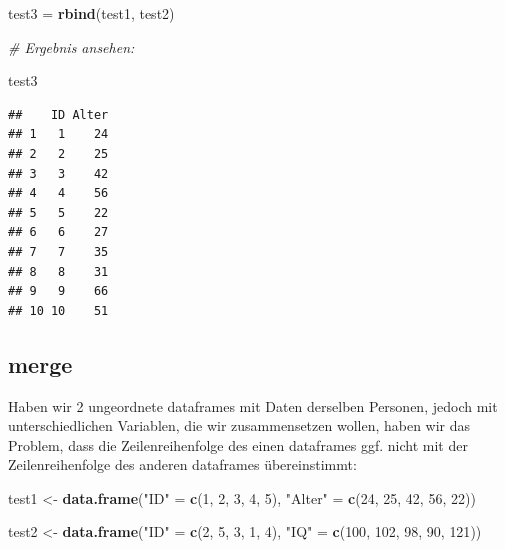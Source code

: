 \documentclass[
]{book}
\newenvironment{Shaded}{\begin{snugshade}}{\end{snugshade}}
\newcommand{\CommentTok}[1]{\textcolor[rgb]{0.56,0.35,0.01}{\textit{#1}}}
\newcommand{\DecValTok}[1]{\textcolor[rgb]{0.00,0.00,0.81}{#1}}
\newcommand{\FunctionTok}[1]{\textcolor[rgb]{0.13,0.29,0.53}{\textbf{#1}}}
\newcommand{\NormalTok}[1]{#1}
\newcommand{\OtherTok}[1]{\textcolor[rgb]{0.56,0.35,0.01}{#1}}
\newcommand{\StringTok}[1]{\textcolor[rgb]{0.31,0.60,0.02}{#1}}
\begin{document}
\begin{Shaded}
\begin{Highlighting}[]
\NormalTok{test3 }\OtherTok{=} \FunctionTok{rbind}\NormalTok{(test1, test2)}

\CommentTok{\# Ergebnis ansehen:}

\NormalTok{test3}
\end{Highlighting}
\end{Shaded}

\begin{verbatim}
##    ID Alter
## 1   1    24
## 2   2    25
## 3   3    42
## 4   4    56
## 5   5    22
## 6   6    27
## 7   7    35
## 8   8    31
## 9   9    66
## 10 10    51
\end{verbatim}

\subsection{merge}\label{merge}

Haben wir 2 ungeordnete dataframes mit Daten derselben Personen, jedoch mit unterschiedlichen Variablen, die wir zusammensetzen wollen, haben wir das Problem, dass die Zeilenreihenfolge des einen dataframes ggf. nicht mit der Zeilenreihenfolge des anderen dataframes übereinstimmt:

\begin{Shaded}
\begin{Highlighting}[]
\NormalTok{test1 }\OtherTok{\textless{}{-}} \FunctionTok{data.frame}\NormalTok{(}\StringTok{"ID"} \OtherTok{=} \FunctionTok{c}\NormalTok{(}\DecValTok{1}\NormalTok{, }\DecValTok{2}\NormalTok{, }\DecValTok{3}\NormalTok{, }\DecValTok{4}\NormalTok{, }\DecValTok{5}\NormalTok{),}
                    \StringTok{"Alter"} \OtherTok{=} \FunctionTok{c}\NormalTok{(}\DecValTok{24}\NormalTok{, }\DecValTok{25}\NormalTok{, }\DecValTok{42}\NormalTok{, }\DecValTok{56}\NormalTok{, }\DecValTok{22}\NormalTok{))}

\NormalTok{test2 }\OtherTok{\textless{}{-}} \FunctionTok{data.frame}\NormalTok{(}\StringTok{"ID"} \OtherTok{=} \FunctionTok{c}\NormalTok{(}\DecValTok{2}\NormalTok{, }\DecValTok{5}\NormalTok{, }\DecValTok{3}\NormalTok{, }\DecValTok{1}\NormalTok{, }\DecValTok{4}\NormalTok{),}
                    \StringTok{"IQ"} \OtherTok{=} \FunctionTok{c}\NormalTok{(}\DecValTok{100}\NormalTok{, }\DecValTok{102}\NormalTok{, }\DecValTok{98}\NormalTok{, }\DecValTok{90}\NormalTok{, }\DecValTok{121}\NormalTok{))}
\end{Highlighting}
\end{Shaded}
\end{document}

